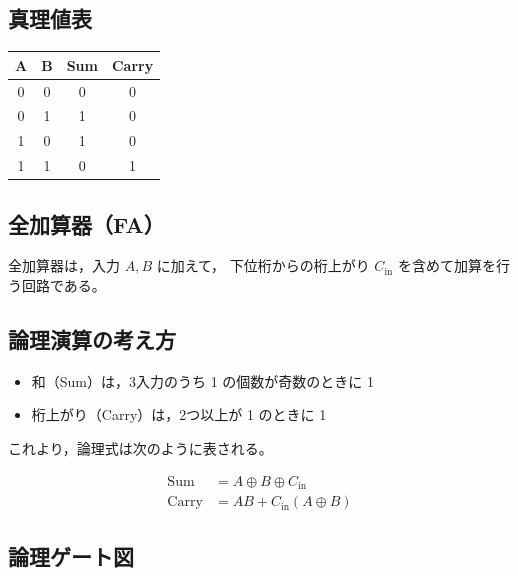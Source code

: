 \subsection*{真理値表}

\begin{center}
\begin{tabular}{cc|cc}
\toprule
A & B & Sum & Carry \\
\midrule
0 & 0 & 0 & 0 \\
0 & 1 & 1 & 0 \\
1 & 0 & 1 & 0 \\
1 & 1 & 0 & 1 \\
\bottomrule
\end{tabular}
\end{center}

\subsection{全加算器（FA）}

全加算器は，入力 $A,B$ に加えて，
下位桁からの桁上がり $C_{\text{in}}$ を含めて加算を行う回路である。

\subsection*{論理演算の考え方}

\begin{itemize}
  \item 和（Sum）は，3入力のうち 1 の個数が奇数のときに 1
  \item 桁上がり（Carry）は，2つ以上が 1 のときに 1
\end{itemize}

これより，論理式は次のように表される。

\begin{align*}
\text{Sum} &= A \oplus B \oplus C_{\text{in}} \\
\text{Carry} &= AB + C_{\text{in}}(A \oplus B)
\end{align*}

\subsection*{論理ゲート図}

